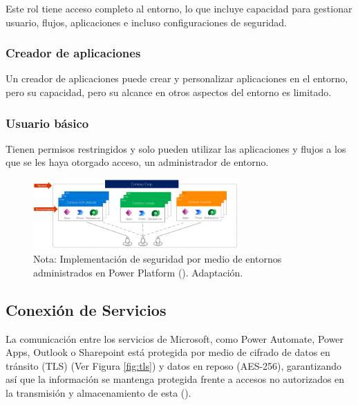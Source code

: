 \documentclass[letter,oneside,12pt,spanish]{report}
\begin{document}
\noindent Este rol tiene acceso completo al entorno, lo que incluye capacidad para gestionar usuario, flujos, aplicaciones e incluso configuraciones de seguridad.

\subsubsection{Creador de aplicaciones}

\noindent Un creador de aplicaciones puede crear y personalizar aplicaciones en el entorno, pero su capacidad, pero su alcance en otros aspectos del entorno es limitado.

\subsubsection{Usuario básico}

\noindent Tienen permisos restringidos y solo pueden utilizar las aplicaciones y flujos a los que se les haya otorgado acceso, un administrador de entorno.

\begin{figure}[ht]
    \centering
    \includegraphics[width=0.7\textwidth]{Figs/gestion de entornos microsoft.png}
    \label{fig:entornos}
    \\Nota:  Implementación de seguridad por medio de entornos administrados en Power Platform (\cite{microsoft2024environments}). Adaptación.
\end{figure}


\subsection{Conexión de Servicios}

\noindent La comunicación entre los servicios de Microsoft, como Power Automate, Power Apps, Outlook o Sharepoint está protegida por medio de cifrado de datos en tránsito (TLS) (Ver Figura \ref{fig:tls}) y datos en reposo (AES-256), garantizando así que la información se mantenga protegida frente a accesos no autorizados en la transmisión y almacenamiento de esta (\cite{microsoft2024encryption}).
\end{document}
